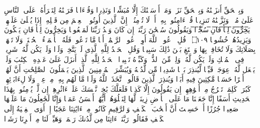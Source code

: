 \stopbuffer%
\startbuffer[\q:17:105]
وَبِٱلۡحَقِّ أَنزَلۡنَٰهُ وَبِٱلۡحَقِّ نَزَلَۗ وَمَاۤ أَرۡسَلۡنَٰكَ إِلَّا مُبَشِّرࣰا وَنَذِیرࣰا%
\stopbuffer%
\startbuffer[\q:17:106]
وَقُرۡءَانࣰا فَرَقۡنَٰهُ لِتَقۡرَأَهُۥ عَلَى ٱلنَّاسِ عَلَىٰ مُكۡثࣲ وَنَزَّلۡنَٰهُ تَنزِیلࣰا%
\stopbuffer%
\startbuffer[\q:17:107]
قُلۡ ءَامِنُوا۟ بِهِۦۤ أَوۡ لَا تُؤۡمِنُوۤا۟ۚ إِنَّ ٱلَّذِینَ أُوتُوا۟ ٱلۡعِلۡمَ مِن قَبۡلِهِۦۤ إِذَا یُتۡلَىٰ عَلَیۡهِمۡ یَ̅خِ̅رُّ̅و̅نَ̅ ̅لِ̅لۡ̅أَ̅ذۡ̅قَ̅ا̅نِ̅ ̅سُ̅جَّ̅دࣰ̅ا̅%
\stopbuffer%
\startbuffer[\q:17:108]
وَیَقُولُونَ سُبۡحَٰنَ رَبِّنَاۤ إِن كَانَ وَعۡدُ رَبِّنَا لَمَفۡعُولࣰا%
\stopbuffer%
\startbuffer[\q:17:109]
وَیَخِرُّونَ لِلۡأَذۡقَانِ یَبۡكُونَ وَیَزِیدُهُمۡ خُشُوعࣰا ۝١٠٩ ۩%
\stopbuffer%
\startbuffer[\q:17:110]
قُلِ ٱدۡعُوا۟ ٱللَّهَ أَوِ ٱدۡعُوا۟ ٱلرَّحۡمَٰنَۖ أَیࣰّا مَّا تَدۡعُوا۟ فَلَهُ ٱلۡأَسۡمَاۤءُ ٱلۡحُسۡنَىٰۚ وَلَا تَجۡهَرۡ بِصَلَاتِكَ وَلَا تُخَافِتۡ بِهَا وَٱبۡتَغِ بَیۡنَ ذَٰلِكَ سَبِیلࣰا%
\stopbuffer%
\startbuffer[\q:17:111]
وَقُلِ ٱلۡحَمۡدُ لِلَّهِ ٱلَّذِی لَمۡ یَتَّخِذۡ وَلَدࣰا وَلَمۡ یَكُن لَّهُۥ شَرِیكࣱ فِی ٱلۡمُلۡكِ وَلَمۡ یَكُن لَّهُۥ وَلِیࣱّ مِّنَ ٱلذُّلِّۖ وَكَبِّرۡهُ تَكۡبِیرَۢا%
\stopbuffer%
\startbuffer[\q:18:1]
ٱلۡحَمۡدُ لِلَّهِ ٱلَّذِیۤ أَنزَلَ عَلَىٰ عَبۡدِهِ ٱلۡكِتَٰبَ وَلَمۡ یَجۡعَل لَّهُۥ عِوَجَاۜ%
\stopbuffer%
\startbuffer[\q:18:2]
قَیِّمࣰا لِّیُنذِرَ بَأۡسࣰا شَدِیدࣰا مِّن لَّدُنۡهُ وَیُبَشِّرَ ٱلۡمُؤۡمِنِینَ ٱلَّذِینَ یَعۡمَلُونَ ٱلصَّٰلِحَٰتِ أَنَّ لَهُمۡ أَجۡرًا حَسَنࣰا%
\stopbuffer%
\startbuffer[\q:18:3]
مَّٰكِثِینَ فِیهِ أَبَدࣰا%
\stopbuffer%
\startbuffer[\q:18:4]
وَیُنذِرَ ٱلَّذِینَ قَالُوا۟ ٱتَّخَذَ ٱللَّهُ وَلَدࣰا%
\stopbuffer%
\startbuffer[\q:18:5]
مَّا لَهُم بِهِۦ مِنۡ عِلۡمࣲ وَلَا لِءَابَاۤئِهِمۡۚ كَبُرَتۡ كَلِمَةࣰ تَخۡرُجُ مِنۡ أَفۡوَٰهِهِمۡۚ إِن یَقُولُونَ إِلَّا كَذِبࣰا%
\stopbuffer%
\startbuffer[\q:18:6]
فَلَعَلَّكَ بَٰخِعࣱ نَّفۡسَكَ عَلَىٰۤ ءَاثَٰرِهِمۡ إِن لَّمۡ یُؤۡمِنُوا۟ بِهَٰذَا ٱلۡحَدِیثِ أَسَفًا%
\stopbuffer%
\startbuffer[\q:18:7]
إِنَّا جَعَلۡنَا مَا عَلَى ٱلۡأَرۡضِ زِینَةࣰ لَّهَا لِنَبۡلُوَهُمۡ أَیُّهُمۡ أَحۡسَنُ عَمَلࣰا%
\stopbuffer%
\startbuffer[\q:18:8]
وَإِنَّا لَجَٰعِلُونَ مَا عَلَیۡهَا صَعِیدࣰا جُرُزًا%
\stopbuffer%
\startbuffer[\q:18:9]
أَمۡ حَسِبۡتَ أَنَّ أَصۡحَٰبَ ٱلۡكَهۡفِ وَٱلرَّقِیمِ كَانُوا۟ مِنۡ ءَایَٰتِنَا عَجَبًا%
\stopbuffer%
\startbuffer[\q:18:10]
إِذۡ أَوَى ٱلۡفِتۡیَةُ إِلَى ٱلۡكَهۡفِ فَقَالُوا۟ رَبَّنَاۤ ءَاتِنَا مِن لَّدُنكَ رَحۡمَةࣰ وَهَیِّئۡ لَنَا مِنۡ أَمۡرِنَا رَشَدࣰا%
\stopbuffer%
